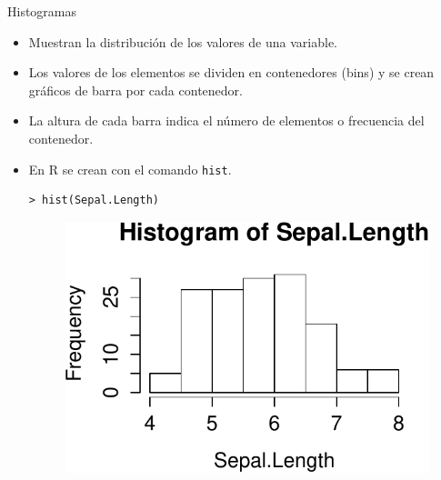 \documentclass[handout]{beamer}
\begin{document}
\begin{frame}[fragile]{Histogramas}
\scriptsize{
\begin{itemize}
 \item Muestran la distribución de los valores de una variable.
 \item Los valores de los elementos se dividen en contenedores (bins) y se crean gráficos de barra por cada contenedor.
 \item La altura de cada barra indica el número de elementos o frecuencia del contenedor.
 \item En R se crean con el comando \verb+hist+.
 \begin{verbatim}
> hist(Sepal.Length)
 \end{verbatim}
 \begin{figure}[h!]
	\centering
	\includegraphics[scale=0.6]{imagenes/hist1.pdf}
	
	
\end{figure} 

\end{itemize}




}
\end{frame}
\end{document}
